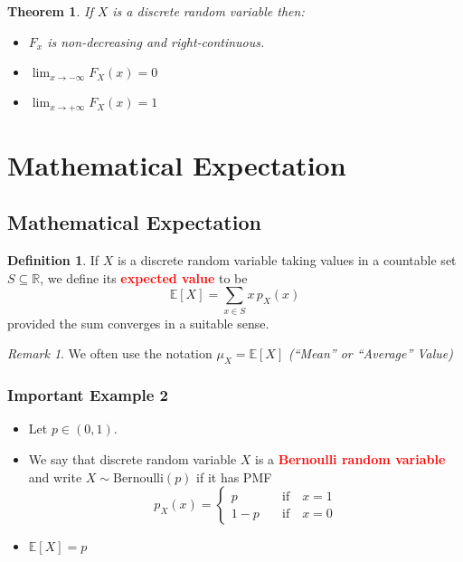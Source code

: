 \documentclass{article}
\newcommand{\R}{\mathbb{R}}
\newcommand{\E}{\mathbb{E}}
\newcommand{\bfred}[1]{\textcolor{red}{\textbf{#1}}}
\theoremstyle{plain}
\newtheorem{thm}{Theorem}[section]
\theoremstyle{definition}
\newtheorem{defn}{Definition}[section]
\theoremstyle{remark}
\newtheorem*{rem}{Remark}
\begin{document}
\begin{thm}
    If $X$ is a discrete random variable then:
    \begin{itemize}
        \item $F_x$ is non-decreasing and right-continuous.
        \item $\displaystyle\lim_{x \rightarrow -\infty} F_X(x) = 0$
        \item $\displaystyle\lim_{x \rightarrow +\infty} F_X(x) = 1$
    \end{itemize}
\end{thm}

\section{Mathematical Expectation}

\subsection{Mathematical Expectation}

\begin{defn}
    If $X$ is a discrete random variable taking values in a countable set $S \subseteq \R$, we define its \bfred{expected value} to be \[\E[X] = \sum_{x \in S} x\,p_X(x)\] provided the sum converges in a suitable sense.
\end{defn}

\begin{rem}
    We often use the notation $\mu_X = \E[X]$ \emph{(``Mean'' or ``Average'' Value)}
\end{rem}

\subsubsection*{Important Example 2}

\begin{tcolorbox}[title = Bernoulli Random Variable, colback = SkyBlue!5!white,colframe = SkyBlue!75!black]
    \begin{itemize}
        \item Let $p \in (0, 1)$.
        \item We say that  discrete random variable $X$ is a \bfred{Bernoulli random variable} and write $X \sim \text{Bernoulli}(p)$ if it has PMF \[p_X(x) = 
        \begin{cases}
            p \quad &\text{if} \quad x = 1 \\
            1- p \quad &\text{if} \quad x = 0
        \end{cases}\]
        \item $\E[X] = p$
    \end{itemize}
\end{tcolorbox}
\end{document}
